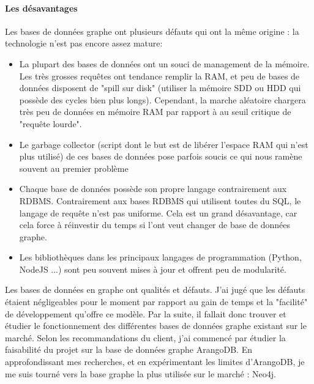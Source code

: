 \documentclass{article} %
\begin{document}
\paragraph{Les désavantages\\}
Les bases de données graphe ont plusieurs défauts qui ont la même origine : la technologie n'est pas encore assez mature:
\begin{itemize}
 \item La plupart des bases de données ont un souci de management de la mémoire. Les très grosses requêtes ont tendance remplir la RAM, et peu de bases de données disposent de "spill sur disk" (utiliser la mémoire SDD ou HDD qui possède des cycles bien plus longs). Cependant, la marche aléatoire chargera très peu de données en mémoire RAM par rapport à au seuil critique de "requête lourde". 
 \item Le garbage collector (script dont le but est de libérer l'espace RAM qui n'est plus utilisé) de ces bases de données pose parfois soucis ce qui nous ramène souvent au premier problème
 \item Chaque base de données possède son propre langage contrairement aux RDBMS. Contrairement aux bases RDBMS qui utilisent toutes du SQL, le langage de requête n'est pas uniforme. Cela est un grand désavantage, car cela force à réinvestir du temps si l'ont veut changer de base de données graphe.
 \item Les bibliothèques dans les principaux langages de programmation (Python, NodeJS ...) sont peu souvent mises à jour et offrent peu de modularité. 
\end{itemize}

Les bases de données en graphe ont qualités et défauts. J'ai jugé que les défauts étaient négligeables pour le moment par rapport au gain de temps et la "facilité" de développement qu'offre ce modèle. Par la suite, il fallait donc trouver et étudier le fonctionnement des différentes bases de données graphe existant sur le marché. Selon les recommandations du client, j'ai commencé par étudier la faisabilité du projet sur la base de données graphe ArangoDB. En approfondissant mes recherches, et en expérimentant les limites d'ArangoDB, je me suis tourné vers la base graphe la plus utilisée sur le marché : Neo4j.
\end{document}
